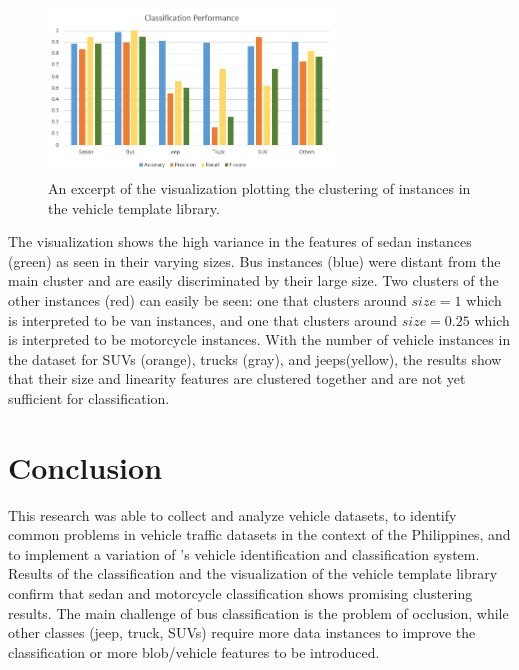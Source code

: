 \documentclass[conference]{IEEEtran}
\begin{document}
\begin{figure}[!ht]
\centering
\includegraphics[width=3in]{classification_performance.png}
\caption{An excerpt of the visualization plotting the clustering of instances in the vehicle template library. }
\label{fig_template_visualization}
\end{figure}

The visualization shows the high variance in the features of sedan instances (green) as seen in their varying sizes. Bus instances (blue) were distant from the main cluster and are easily discriminated by their large size. Two clusters of the other instances (red) can easily be seen: one that clusters around $size = 1$ which is interpreted to be van instances, and one that clusters around $size = 0.25$ which is interpreted to be motorcycle instances. With the number of vehicle instances in the dataset for SUVs (orange), trucks (gray), and jeeps(yellow), the results show that their size and linearity features are clustered together and are not yet sufficient for classification.



\section{Conclusion}

This research was able to collect and analyze vehicle datasets, to identify common problems in vehicle traffic datasets in the context of the Philippines, and to implement a variation of \cite{Jun-Wei}'s vehicle identification and classification system. Results of the classification and the visualization of the vehicle template library confirm that sedan and motorcycle classification shows promising clustering results. The main challenge of bus classification is the problem of occlusion, while other classes (jeep, truck, SUVs) require more data instances to improve the classification or more blob/vehicle features to be introduced.
\end{document}
